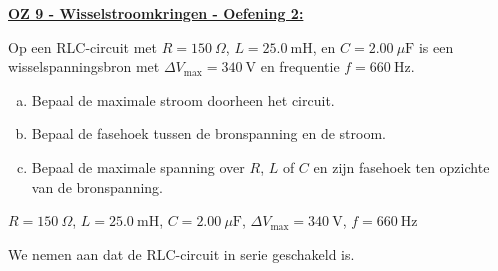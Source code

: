 \textbf{\underline{OZ 9 - Wisselstroomkringen - Oefening 2:}}
\vspace{0.5cm}

Op een RLC-circuit met $R = 150 \ \Omega$, $L = 25.0 \ \text{mH}$, en $ C = 2.00 \ \mu\text{F}$ is een wisselspanningsbron met $\Delta V_{\text{max}} = 340 \ \text{V}$ en frequentie $f = 660 \ \text{Hz}$.

\begin{enumerate}[(a)]
    \item Bepaal de maximale stroom doorheen het circuit.
    \item Bepaal de fasehoek tussen de bronspanning en de stroom.
    \item Bepaal de maximale spanning over $R$, $L$ of $C$ en zijn fasehoek ten opzichte van de bronspanning.
\end{enumerate}

\begin{description}[labelwidth=1.5cm, leftmargin=!]
    \item[Geg. :] $R = 150 \ \Omega$, $L = 25.0 \ \text{mH}$, $ C = 2.00 \ \mu\text{F}$, $\Delta V_{\text{max}} = 340 \ \text{V}$, $f = 660 \ \text{Hz}$
\end{description}

We nemen aan dat de RLC-circuit in serie geschakeld is. 


